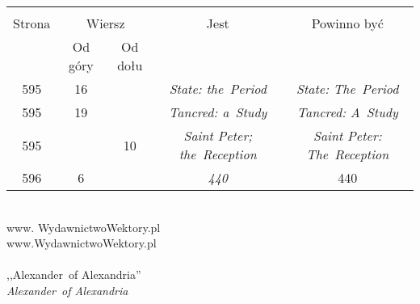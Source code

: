 \documentclass[a4paper,11pt]{article}
\begin{document}
\begin{center}
  \begin{tabular}{|c|c|c|c|c|}
    \hline
    & \multicolumn{2}{c|}{} & & \\
    Strona & \multicolumn{2}{c|}{Wiersz}& Jest
                              & Powinno być \\ \cline{2-3}
    & Od góry & Od dołu & & \\
    \hline
    595 & 16 & & \emph{State: the~Period} & \emph{State: The~Period} \\
    595 & 19 & & \emph{Tancred: a~Study} & \emph{Tancred: A~Study} \\
    595 & & 10 & \emph{Saint Peter; the~Reception}
           & \emph{Saint Peter: The~Reception} \\
    596 &  6 & & \emph{440} & 440 \\
    \hline
  \end{tabular}
\end{center}
\noi
{} \\
\Jest www. WydawnictwoWektory.pl \\
\Pow  www.WydawnictwoWektory.pl \\
 \\
\Jest ,,Alexander~of Alexandria'' \\
\Pow  \emph{Alexander~of Alexandria} \\
\end{document}
